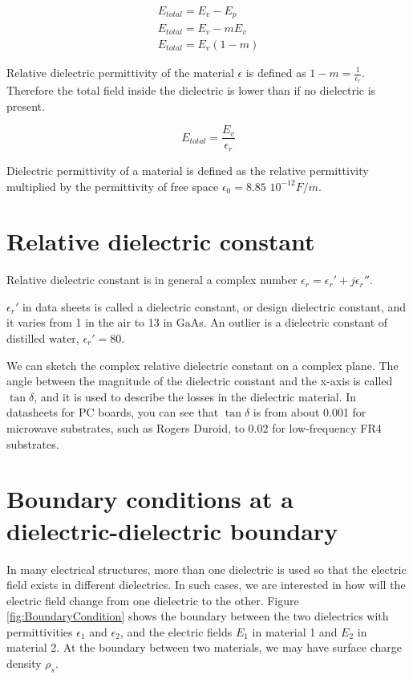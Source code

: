\documentclass{ximera}
\begin{document}
 

\begin{eqnarray}
E_{total}=E_v-E_p \label{eq:sumfield} \\
E_{total}=E_v-m E_v \\
E_{total}=E_v (1-m) \label{eq:sumfield1}
\end{eqnarray}

Relative dielectric permittivity of the material $\epsilon$ is defined as $1-m=\frac{1}{\epsilon_r}$. Therefore the total field inside the dielectric is lower than if no dielectric is present.

\begin{equation}
E_{total}=\frac{E_v}{\epsilon_r}
\end{equation}


Dielectric permittivity of a material is defined as the relative permittivity multiplied by the permittivity of free space $\epsilon_0=8.85 \,\,10^{-12}\unit{F/m}$.



\section{Relative dielectric constant}

Relative dielectric constant is in general a complex number $\epsilon_r=\epsilon_r{'}+j \epsilon_r{''}$. 

$\epsilon_r{'}$ in data sheets is called a dielectric constant, or design dielectric constant, and it varies from 1 in the air to 13 in GaAs. An outlier is a dielectric constant of distilled water, $\epsilon_r{'}=80$.

We can sketch the complex relative dielectric constant on a complex plane. The angle between the magnitude of the dielectric constant and the x-axis is called $\tan \delta$, and it is used to describe the losses in the dielectric material. In datasheets for PC boards, you can see that $\tan \delta$ is from about 0.001 for microwave substrates, such as Rogers Duroid, to 0.02 for low-frequency FR4 substrates.

\section{Boundary conditions at a dielectric-dielectric boundary}



In many electrical structures, more than one dielectric is used so that the electric field exists in different dielectrics. In such cases, we are interested in how will the electric field change from one dielectric to the other. Figure \ref{fig:BoundaryCondition} shows the boundary between the two dielectrics with permittivities $\epsilon_1$ and $\epsilon_2$, and the electric fields $E_1$ in material 1 and $E_2$ in material 2. At the boundary between two materials, we may have surface charge density $\rho_s$.
\end{document}
